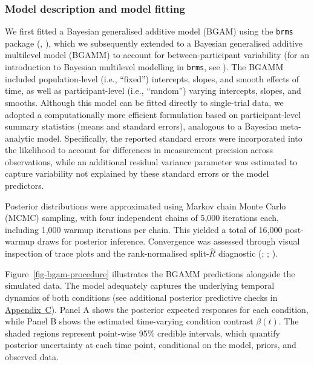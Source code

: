 \documentclass[
  doc,
  floatsintext,
  longtable,
  a4paper,
  nolmodern,
  notxfonts,
  notimes,
  colorlinks=true,linkcolor=blue,citecolor=blue,urlcolor=blue]{apa7}
\begin{document}
\subsubsection{Model description and model
fitting}\label{model-description-and-model-fitting}

We first fitted a Bayesian generalised additive model (BGAM) using the
\texttt{brms} package (,
), which we subsequently extended to a
Bayesian generalised additive multilevel model (BGAMM) to account for
between-participant variability (for an introduction to Bayesian
multilevel modelling in \texttt{brms}, see
). The BGAMM
included population-level (i.e., ``fixed'') intercepts, slopes, and
smooth effects of time, as well as participant-level (i.e., ``random'')
varying intercepts, slopes, and smooths. Although this model can be
fitted directly to single-trial data, we adopted a computationally more
efficient formulation based on participant-level summary statistics
(means and standard errors), analogous to a Bayesian meta-analytic
model. Specifically, the reported standard errors were incorporated into
the likelihood to account for differences in measurement precision
across observations, while an additional residual variance parameter was
estimated to capture variability not explained by these standard errors
or the model predictors.

Posterior distributions were approximated using Markov chain Monte Carlo
(MCMC) sampling, with four independent chains of 5,000 iterations each,
including 1,000 warmup iterations per chain. This yielded a total of
16,000 post-warmup draws for posterior inference. Convergence was
assessed through visual inspection of trace plots and the
rank-normalised split-\(\hat{R}\) diagnostic
(;
;
).

Figure~\ref{fig-bgam-procedure} illustrates the BGAMM predictions
alongside the simulated data. The model adequately captures the
underlying temporal dynamics of both conditions (see additional
posterior predictive checks in \hyperref[apx-basis]{Appendix~C}). Panel
A shows the posterior expected responses for each condition, while Panel
B shows the estimated time-varying condition contrast \(\beta(t)\). The
shaded regions represent point-wise 95\% credible intervals, which
quantify posterior uncertainty at each time point, conditional on the
model, priors, and observed data.
\end{document}
